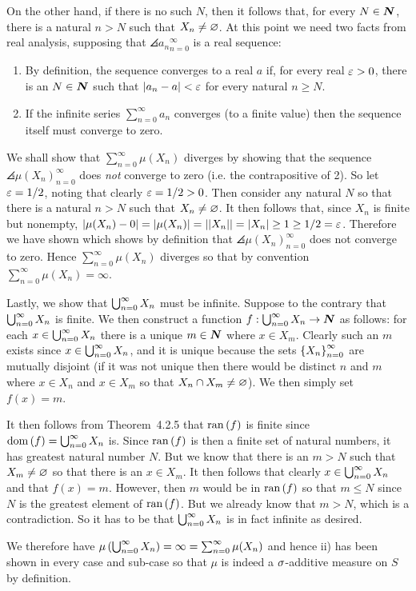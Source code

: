 {{    On the other hand, if there is no such $N$, then it follows that, for every $N \in {\boldsymbol{N}}$, there is a natural $n > N$ such that $X_n \neq \varnothing$.
    At this point we need two facts from real analysis, supposing that $\angles{a_n}_{n=0}^\infty$ is a real sequence:
    \begin{enumerate}
      \item By definition, the sequence converges to a real $a$ if, for every real $\varepsilon > 0$, there is an $N \in {\boldsymbol{N}}$ such that $\left| a_n - a \right| < \varepsilon$ for every natural $n \geq N$.
      \item If the infinite series $\sum_{n=0}^\infty a_n$ converges (to a finite value) then the sequence itself must converge to zero.
    \end{enumerate}
    We shall show that $\sum_{n=0}^\infty \mu(X_n)$ diverges by showing that the sequence $\angles{\mu(X_n)}_{n=0}^\infty$ does \emph{not} converge to zero (i.e. the contrapositive of 2).
    So let $\varepsilon = 1/2$, noting that clearly $\varepsilon = 1/2 > 0$.
    Then consider any natural $N$ so that there is a natural $n > N$ such that $X_n \neq \varnothing$.
    It then follows that, since $X_n$ is finite but nonempty, $\left| \mu(X_n) - 0 \right| = \left| \mu(X_n) \right| = \left| \left| X_n \right| \right| = \left| X_n \right| \geq 1 \geq 1/2 = \varepsilon$.
    Therefore we have shown
    which shows by definition that $\angles{\mu(X_n)}_{n=0}^\infty$ does not converge to zero.
    Hence $\sum_{n=0}^\infty \mu(X_n)$ diverges so that by convention $\sum_{n=0}^\infty \mu(X_n) = \infty$.

    Lastly, we show that $\bigcup_{n=0}^\infty X_n$ must be infinite.
    Suppose to the contrary that $\bigcup_{n=0}^\infty X_n$ is finite.
    We then construct a function $f : \bigcup_{n=0}^\infty X_n \to {\boldsymbol{N}}$ as follows: for each $x \in \bigcup_{n=0}^\infty X_n$ there is a unique $m \in {\boldsymbol{N}}$ where $x \in X_m$.
    Clearly such an $m$ exists since $x \in \bigcup_{n=0}^\infty X_n$, and it is unique because the sets $\left\{ X_n \right\}_{n=0}^\infty$ are mutually disjoint (if it was not unique then there would be distinct $n$ and $m$ where $x \in X_n$ and $x \in X_m$ so that $X_n \cap X_m \neq \varnothing$).
    We then simply set $f(x) = m$.

    It then follows from Theorem~4.2.5 that $\mathrm{ran}\,(f)$ is finite since $\mathrm{dom}\,(f) = \bigcup_{n=0}^\infty X_n$ is.
    Since $\mathrm{ran}\,(f)$ is then a finite set of natural numbers, it has greatest natural number $N$.
    But we know that there is an $m > N$ such that $X_m \neq \varnothing$ so that there is an $x \in X_m$.
    It then follows that clearly $x \in \bigcup_{n=0}^\infty X_n$ and that $f(x) = m$.
    However, then $m$ would be in $\mathrm{ran}\,(f)$ so that $m \leq N$ since $N$ is the greatest element of $\mathrm{ran}\,(f)$.
    But we already know that $m > N$, which is a contradiction.
    So it has to be that $\bigcup_{n=0}^\infty X_n$ is in fact infinite as desired.

    We therefore have $\mu\left( \bigcup_{n=0}^\infty X_n \right) = \infty = \sum_{n=0}^\infty \mu(X_n)$ and hence ii) has been shown in every case and sub-case so that $\mu$ is indeed a $\sigma$-additive measure on $S$ by definition.
  }
}
